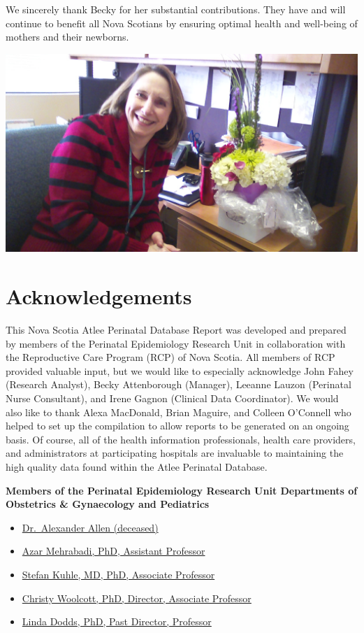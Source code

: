 \documentclass[
]{krantz}
\begin{document}
We sincerely thank Becky for her substantial contributions. They have and will continue to benefit all Nova Scotians by ensuring optimal health and well-being of mothers and their newborns.

\begin{center}\includegraphics[width=0.4\linewidth]{images/Becky20} \end{center}

\hypertarget{acknowledgements}{%
\chapter*{Acknowledgements}\label{acknowledgements}}


This Nova Scotia Atlee Perinatal Database Report was developed and prepared by members of the Perinatal
Epidemiology Research Unit in collaboration with the Reproductive Care Program (RCP) of Nova Scotia. All
members of RCP provided valuable input, but we would like to especially acknowledge John Fahey (Research Analyst), Becky Attenborough (Manager), Leeanne Lauzon (Perinatal Nurse Consultant), and Irene Gagnon (Clinical Data Coordinator). We would also like to thank Alexa MacDonald, Brian Maguire, and Colleen O'Connell who helped to set up the compilation to allow reports to be generated on an ongoing basis. Of course, all of the health information professionals, health care providers, and administrators at participating hospitals are invaluable to maintaining the high quality data found within the Atlee Perinatal Database.

\textbf{Members of the Perinatal Epidemiology Research Unit Departments of Obstetrics \& Gynaecology and Pediatrics}

\begin{itemize}
\item
  \href{https://medicine.dal.ca/research/peru/our-people/faculty.html}{Dr.~Alexander Allen (deceased)}
\item
  \href{https://medicine.dal.ca/departments/department-sites/pediatrics/our-people/our-faculty/azar-mehrabadi.html}{Azar Mehrabadi, PhD, Assistant Professor}
\item
  \href{https://www.unimedizin-mainz.de/pe/startseite/team.html}{Stefan Kuhle, MD, PhD, Associate Professor}
\item
  \href{https://medicine.dal.ca/departments/department-sites/pediatrics/our-people/our-faculty/christy-woolcott.html}{Christy Woolcott, PhD, Director, Associate Professor}
\item
  \href{https://medicine.dal.ca/departments/department-sites/pediatrics/our-people/our-faculty/linda-dodds.html}{Linda Dodds, PhD, Past Director, Professor}
\end{itemize}
\end{document}
